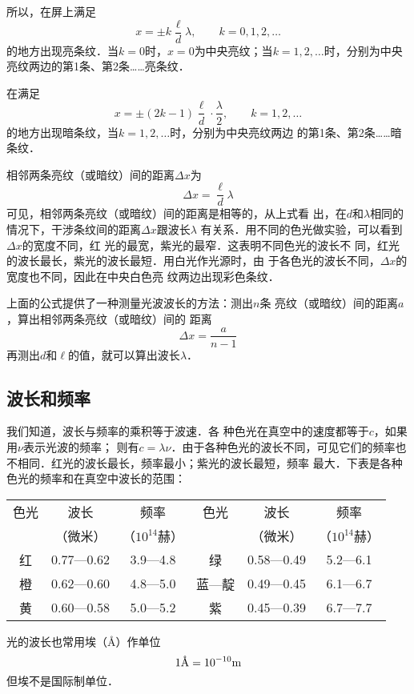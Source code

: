 所以，在屏上满足
\[x=\pm k\frac{\ell}{d}\lambda, \qquad k=0,1,2,\ldots \]
的地方出现亮条纹．当$k=0$时，$x=0$为中央亮纹；当$k=1,
2,\ldots$时，分别为中央亮纹两边的第1条、第2条……亮条纹．

在满足
\[x=\pm(2k-1)\frac{\ell}{d}\cdot \frac{\lambda}{2},\qquad k=1,2,\ldots \]
的地方出现暗条纹，当$k=1,2,\ldots$时，分别为中央亮纹两边
的第1条、第2条……暗条纹．

相邻两条亮纹（或暗纹）间的距离$\Delta x$为
\[\Delta x=\frac{\ell}{d}\lambda \]
可见，相邻两条亮纹（或暗纹）间的距离是相等的，从上式看
出，在$d$和$\lambda$相同的情况下，干涉条纹间的距离$\Delta x$跟波长$\lambda$
有关系．用不同的色光做实验，可以看到$\Delta x$的宽度不同，红
光的最宽，紫光的最窄．这表明不同色光的波长不
同，红光的波长最长，紫光的波长最短．用白光作光源时，由
于各色光的波长不同，$\Delta x$的宽度也不同，因此在中央白色亮
纹两边出现彩色条纹．

上面的公式提供了一种测量光波波长的方法：测出$n$条
亮纹（或暗纹）间的距离$a$，算出相邻两条亮纹（或暗纹）间的
距离
\[\Delta x=\frac{a}{n-1} \]
再测出$d$和$\ell$的值，就可以算出波长$\lambda$．

\subsection{波长和频率}

我们知道，波长与频率的乘积等于波速．各
种色光在真空中的速度都等于$c$，如果用$\nu$表示光波的频率；
则有$c=\lambda\nu$．由于各种色光的波长不同，可见它们的频率也
不相同．红光的波长最长，频率最小；紫光的波长最短，频率
最大．下表是各种色光的频率和在真空中波长的范围：
\begin{center}
    \begin{tabular}{cccccc}
        \hline
        色光   &     波长    &    频率    &    色光    &    波长   &     频率     \\
        &（微米）&（$10^{14}$赫）&    &（微米）&（$10^{14}$赫）\\
        \hline
        红   &  0.77—0.62   &     3.9—4.8    &    绿&0.58—0.49    &    5.2—6.1\\
        橙   & 0.62—0.60    &    4.8—5.0     &   蓝—靛    &    0.49—0.45    &    6.1—6.7\\
        黄&0.60—0.58   &     5.0—5.2     &   紫      &  0.45—0.39      &  6.7—7.7\\
        \hline
    \end{tabular}
\end{center}

光的波长也常用埃（\AA）作单位
\[1\text{\AA}=10^{-10}{\rm m}\]
但埃不是国际制单位．

